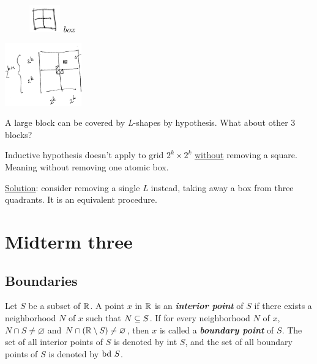 \documentclass[12pt]{article}
\begin{document}
\begin{itemize}
\begin{figure}[htbp]
\centering
\includegraphics[width=50]{Midterm two/screenshot_2017-03-03_16-00-29.png}
\Leftarrow\textit{box}
\end{figure} 

\begin{center}
\includegraphics[width=125]{Midterm two/screenshot_2017-03-03_16-01-43.png}
\end{center} A large block can be
covered by \emph{L}-shapes by hypothesis. What about other 3 blocks?

Inductive hypothesis doesn't apply to grid \(2^k\times2^k\) \uline{without}
removing a square. Meaning without removing one atomic box.

\uline{Solution}: consider removing a single \emph{L} instead, taking away a box from
three quadrants. It is an equivalent procedure.
\end{itemize}

\section{Midterm three}
\label{sec:org232f747}
\subsection{Boundaries}
\label{sec:org7d0c439}
\begin{definition}
  Let $S$ be a subset of $\mathbb{R}$. A point $x$ in $\mathbb{R}$ is an
  \textit{\textbf{interior point}} of $S$ if there exists a neighborhood $N$
  of $x$ such that $N \subseteq S$. If for every neighborhood $N$ of $x$, $N \cap
  S \ne \varnothing$ and $N \cap (\mathbb{R} \setminus S) \ne \varnothing$, then $x$ is called a
  \textit{\textbf{boundary point}} of $S$. The set of all interior points of
  $S$ is denoted by int $S$, and the set of all boundary points of $S$ is
  denoted by $\text{bd }S$.
\end{definition}
\end{document}
